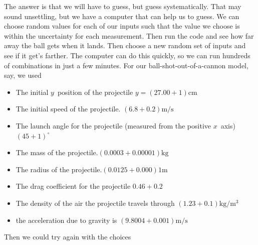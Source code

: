 \documentclass[twoside,11pt,ShortChapTitles]{BYUTextbook}
\begin{document}
The answer is that we will have to guess, but guess systematically. That may
sound unsettling, but we have a computer that can help us to guess. We can
choose random values for each of our inputs such that the value we choose is
within the uncertainty for each measurement. Then run the code and see how
far away the ball gets when it lands. Then choose a new random set of inputs
and see if it get's farther. The computer can do this quickly, so we can run
hundreds of combinations in just a few minutes. For our
ball-shot-out-of-a-cannon model, say, we used

\begin{itemize}
\item {\small The initial }$y${\small \ position of the projectile }$%
y=\left( 27.00+1\right) \text{cm}$

\item {\small The initial speed of the projectile. }$\left( 6.8+0.2\right)
\text{m}/\text{s}$

\item {\small The launch angle for the projectile (measured from the
positive }$x${\small \ axis) }$\left( 45+1\right)^\circ$

\item {\small The mass of the projectile.}$\left( 0.0003+0.00001\right)
\text{kg}$

\item {\small The radius of the projectile.}$\left( 0.0125+0.000\right) 1%
\text{m}$

\item {\small The drag coefficient for the projectile }$0.46+0.2$

\item {\small The density of the air the projectile travels through }$\left(
1.23+0.1\right) \text{kg}/\text{m}^{3}$

\item {\small the acceleration due to gravity is }$\left(
9.8004+0.001\right) \text{m}/\text{s}$
\end{itemize}

Then we could try again with the choices
\end{document}
